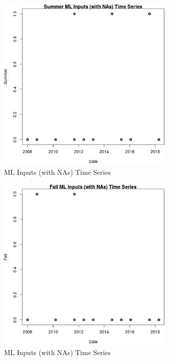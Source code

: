 \begin{figure} 
\centering  
\includegraphics[width=0.77\textwidth]{Code_Outputs/Report_ML_input_PM25_Step4_part_e_de_duplicated_aves_compiled_2019-05-18wNAs_SummervDate.jpg} 
\caption{\label{fig:Report_ML_input_PM25_Step4_part_e_de_duplicated_aves_compiled_2019-05-18wNAsSummervDate}ML Inputs (with NAs) Time Series} 
\end{figure} 
 

\begin{figure} 
\centering  
\includegraphics[width=0.77\textwidth]{Code_Outputs/Report_ML_input_PM25_Step4_part_e_de_duplicated_aves_compiled_2019-05-18wNAs_FallvDate.jpg} 
\caption{\label{fig:Report_ML_input_PM25_Step4_part_e_de_duplicated_aves_compiled_2019-05-18wNAsFallvDate}ML Inputs (with NAs) Time Series} 
\end{figure} 
 
